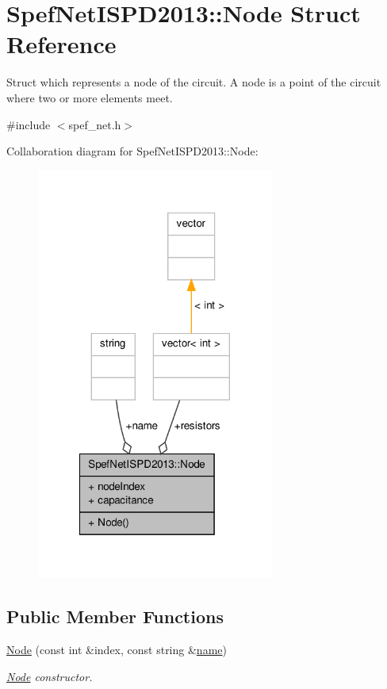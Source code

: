 \hypertarget{structSpefNetISPD2013_1_1Node}{\section{Spef\-Net\-I\-S\-P\-D2013\-:\-:Node Struct Reference}
\label{structSpefNetISPD2013_1_1Node}
}


Struct which represents a node of the circuit. A node is a point of the circuit where two or more elements meet.  




{\ttfamily \#include $<$spef\-\_\-net.\-h$>$}



Collaboration diagram for Spef\-Net\-I\-S\-P\-D2013\-:\-:Node\-:\nopagebreak
\begin{figure}[H]
\begin{center}
\leavevmode
\includegraphics[width=221pt]{structSpefNetISPD2013_1_1Node__coll__graph}
\end{center}
\end{figure}
\subsection*{Public Member Functions}
\begin{DoxyCompactItemize}
\item 
\hyperlink{structSpefNetISPD2013_1_1Node_afe9790ca4fcf757354ffb0dc3b578646}{Node} (const int \&index, const string \&\hyperlink{structSpefNetISPD2013_1_1Node_a7bc1303eeb250a3f7e047b8ec03d5e3e}{name})
\begin{DoxyCompactList}\small\item\em \hyperlink{structSpefNetISPD2013_1_1Node}{Node} constructor. \end{DoxyCompactList}\end{DoxyCompactItemize}
